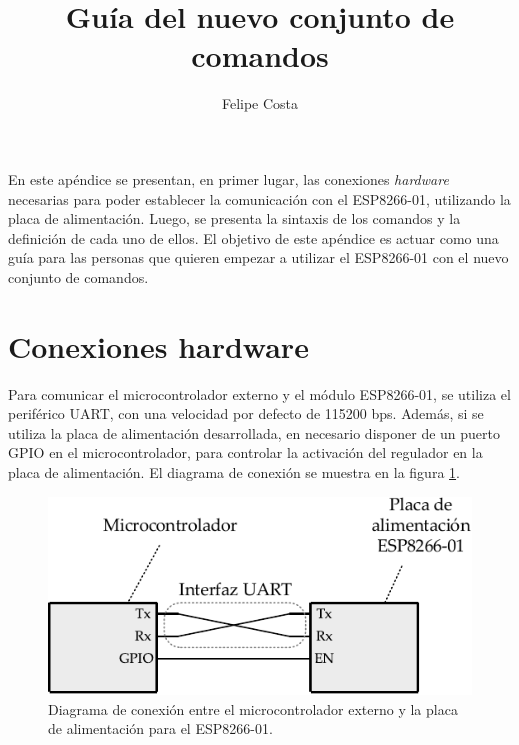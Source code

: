 \documentclass[a4paper,spanish,11pt]{article}
\title{Guía del nuevo conjunto de comandos}
\author{Felipe Costa}
\begin{document}
\maketitle

\renewcommand{\contentsname}{Contenido}
\tableofcontents

\newpage


En este apéndice se presentan, en primer lugar, las conexiones \textit{hardware} necesarias para poder establecer la comunicación con el ESP8266-01, utilizando la placa de alimentación. Luego, se presenta la sintaxis de los comandos y la definición de cada uno de ellos. El objetivo de este apéndice es actuar como una guía para las personas que quieren empezar a utilizar el ESP8266-01 con el nuevo conjunto de comandos.

\section{Conexiones hardware}
Para comunicar el microcontrolador externo y el módulo ESP8266-01, se utiliza el periférico UART, con una velocidad por defecto de 115200 bps. Además, si se utiliza la placa de alimentación desarrollada, en necesario disponer de un puerto GPIO en el microcontrolador, para controlar la activación del regulador en la placa de alimentación. El diagrama de conexión se muestra en la figura \ref{fig:conexion_mcu_placa_alimentacion}. 

\begin{figure}[H]
	\centering
	\includegraphics[scale=1]{conexion_mcu_placa_alimentacion.pdf}
	\caption{Diagrama de conexión entre el microcontrolador externo y la placa de alimentación para el ESP8266-01.}
	\label{fig:conexion_mcu_placa_alimentacion}
\end{figure}
\end{document}

